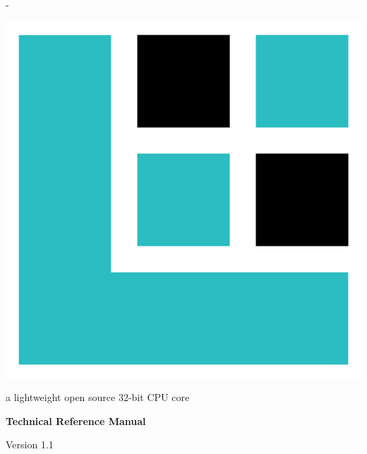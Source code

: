\frontmatter


\thispagestyle{empty}
\calccentering{\unitlength}
\begin{adjustwidth*}{\unitlength}{-\unitlength}
	\vspace*{\fill}
	\begin{center}
	\DoubleSpacing
	\includegraphics[scale=0.2]{images/lxp32-logo.pdf}\par
	\vspace{\onelineskip}
	\huge \lxp{}\par
	\Large a lightweight open source 32-bit CPU core\par
	\LARGE \textbf{Technical Reference Manual}\par
	\vspace{1.2\onelineskip}
	\large Version 1.1\par
	\vspace*{4\onelineskip}
	\end{center}
	\vspace*{\fill}
\end{adjustwidth*}

\clearpage


\thispagestyle{empty}

